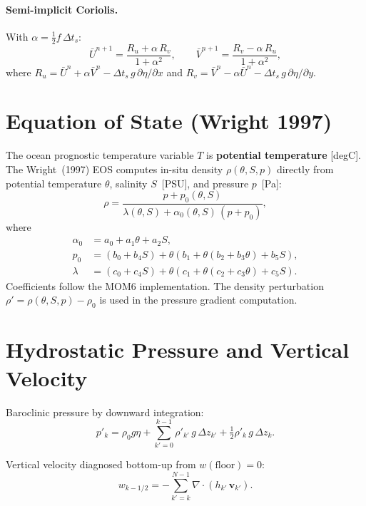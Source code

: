 \documentclass[11pt,twoside]{report}
\newcommand{\pp}{\partial}
\newcommand{\half}{\tfrac{1}{2}}
\newcommand{\vect}[1]{\bm{#1}}
\newcommand{\divg}{\nabla\!\cdot\!}
\begin{document}
\paragraph{Semi-implicit Coriolis.}
With $\alpha=\half f\,\Delta t_s$:
\begin{equation}
  \bar U^{n+1} = \frac{R_u+\alpha\,R_v}{1+\alpha^2},
  \qquad
  \bar V^{n+1} = \frac{R_v-\alpha\,R_u}{1+\alpha^2},
\end{equation}
where $R_u=\bar U^n+\alpha\bar V^n-\Delta t_s\,g\,\pp\eta/\pp x$ and
$R_v=\bar V^n-\alpha\bar U^n-\Delta t_s\,g\,\pp\eta/\pp y$.


\section{Equation of State (Wright 1997)}
\label{sec:eos}

The ocean prognostic temperature variable $T$ is \textbf{potential
temperature} [degC].  The Wright~(1997) EOS computes in-situ density
$\rho(\theta,S,p)$ directly from potential temperature $\theta$,
salinity $S$~[PSU], and pressure $p$~[Pa]:
\begin{equation}
  \rho = \frac{p+p_0(\theta,S)}{\lambda(\theta,S)+\alpha_0(\theta,S)\,(p+p_0)},
\end{equation}
where
\begin{align}
  \alpha_0 &= a_0+a_1 \theta+a_2 S, \\
  p_0 &= (b_0+b_4 S)+\theta(b_1+\theta(b_2+b_3 \theta)+b_5 S), \\
  \lambda &= (c_0+c_4 S)+\theta(c_1+\theta(c_2+c_3 \theta)+c_5 S).
\end{align}
Coefficients follow the MOM6 implementation.  The density perturbation
$\rho'=\rho(\theta,S,p)-\rho_0$ is used in the pressure gradient computation.


\section{Hydrostatic Pressure and Vertical Velocity}

Baroclinic pressure by downward integration:
\begin{equation}
  p'_k = \rho_0 g\eta + \sum_{k'=0}^{k-1}\rho'_{k'}\,g\,\Delta z_{k'}
  + \half\rho'_k\,g\,\Delta z_k.
\end{equation}

Vertical velocity diagnosed bottom-up from $w(\text{floor})=0$:
\begin{equation}
  w_{k-1/2} = -\sum_{k'=k}^{N-1}\divg(h_{k'}\,\vect{v}_{k'}).
\end{equation}
\end{document}
